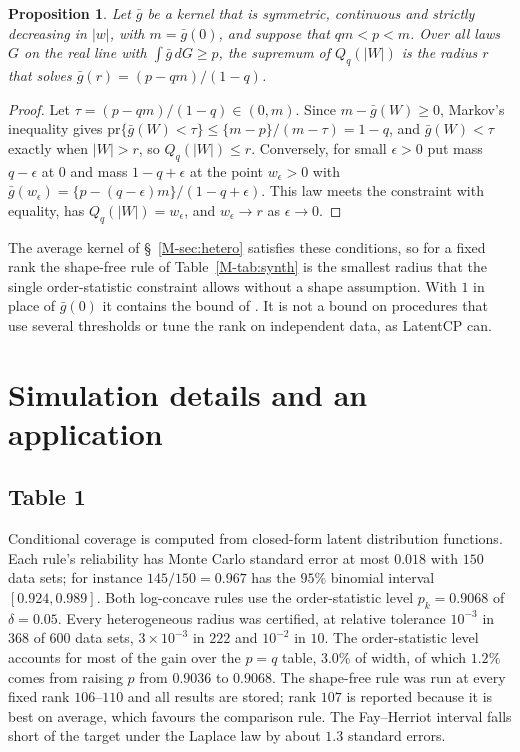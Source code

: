\documentclass[11pt]{article}
\newtheorem{proposition}{Proposition}
\newcommand{\pr}{\mathrm{pr}}
\begin{document}
\begin{proposition}\label{prop:shapefree}
Let $\bar g$ be a kernel that is symmetric, continuous and strictly decreasing in $|w|$, with $m = \bar g(0)$, and suppose that $qm < p < m$. Over all laws $G$ on the real line with $\int \bar g\,dG \ge p$, the supremum of $Q_q(|W|)$ is the radius $r$ that solves $\bar g(r) = (p - qm)/(1 - q)$.
\end{proposition}

\begin{proof}
Let $\tau = (p - qm)/(1-q) \in (0, m)$. Since $m - \bar g(W) \ge 0$, Markov's inequality gives $\pr\{\bar g(W) < \tau\} \le \{m - p\}/(m - \tau) = 1 - q$, and $\bar g(W) < \tau$ exactly when $|W| > r$, so $Q_q(|W|) \le r$. Conversely, for small $\epsilon > 0$ put mass $q - \epsilon$ at $0$ and mass $1 - q + \epsilon$ at the point $w_\epsilon > 0$ with $\bar g(w_\epsilon) = \{p - (q - \epsilon)m\}/(1 - q + \epsilon)$. This law meets the constraint with equality, has $Q_q(|W|) = w_\epsilon$, and $w_\epsilon \to r$ as $\epsilon \to 0$.
\end{proof}

The average kernel of \S~\ref{M-sec:hetero} satisfies these conditions, so for a fixed rank the shape-free rule of Table~\ref{M-tab:synth} is the smallest radius that the single order-statistic constraint allows without a shape assumption. With $1$ in place of $\bar g(0)$ it contains the bound of \citet{guille2024}. It is not a bound on procedures that use several thresholds or tune the rank on independent data, as LatentCP \citep{zheng2026} can.

\section{Simulation details and an application}\label{sec:s-sim}

\subsection*{Table 1}

Conditional coverage is computed from closed-form latent distribution functions. Each rule's reliability has Monte Carlo standard error at most $0.018$ with $150$ data sets; for instance $145/150 = 0.967$ has the $95\%$ binomial interval $[0.924, 0.989]$. Both log-concave rules use the order-statistic level $p_k = 0.9068$ of $\delta = 0.05$. Every heterogeneous radius was certified, at relative tolerance $10^{-3}$ in $368$ of $600$ data sets, $3\times10^{-3}$ in $222$ and $10^{-2}$ in $10$. The order-statistic level accounts for most of the gain over the $p = q$ table, $3.0\%$ of width, of which $1.2\%$ comes from raising $p$ from $0.9036$ to $0.9068$. The shape-free rule was run at every fixed rank $106$--$110$ and all results are stored; rank $107$ is reported because it is best on average, which favours the comparison rule. The Fay--Herriot interval falls short of the target under the Laplace law by about $1.3$ standard errors.
\end{document}

